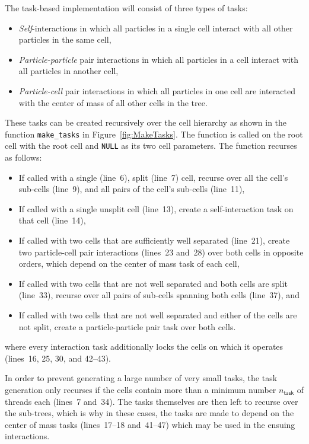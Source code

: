 \documentclass[preprint]{elsarticle}
\newcommand{\fig}[1]
    {Figure~\ref{fig:#1}}
\begin{document}
The task-based implementation will consist of three
types of tasks:
\begin{itemize}
    \item {\em Self}-interactions in which all particles
        in a single cell interact with all other particles in the
        same cell,
    \item {\em Particle-particle} pair interactions in which
        all particles in a cell interact with all
        particles in another cell,
    \item {\em Particle-cell} pair interactions in which
        all particles in one cell are interacted with the
        center of mass of all other cells in the tree.
\end{itemize}

These tasks can be created recursively over the cell hierarchy
as shown in the function {\tt make\_tasks} in \fig{MakeTasks}.
The function is called on the root cell with the root cell
and {\tt NULL} as its two cell parameters.
The function recurses as follows:
\begin{itemize}
    \item If called with a single (line~6), split (line~7) cell,
        recurse over all the cell's sub-cells (line~9), and all
        pairs of the cell's sub-cells (line~11),
    \item If called with a single unsplit cell (line~13),
        create a self-interaction task on that cell (line~14),
    \item If called with two cells that are sufficiently well
        separated (line~21), create two particle-cell pair
        interactions (lines~23 and~28) over both cells in
        opposite orders, which depend on the center of mass
        task of each cell,
    \item If called with two cells that are not well
        separated and both cells are split (line~33),
        recurse over all pairs of sub-cells spanning
        both cells (line~37), and
    \item If called with two cells that are not well separated
        and either of the cells are not split, create
        a particle-particle pair task over both cells.
\end{itemize}
\noindent where every interaction task additionally locks
the cells on which it operates (lines~16, 25, 30, and 42--43).

In order to prevent generating
a large number of very small tasks, the task generation only recurses
if the cells contain more than a minimum number $n_\mathsf{task}$
of threads each (lines~7 and~34).
The tasks themselves are then left to recurse over the sub-trees,
which is why in these cases, the tasks are made to depend on the
center of mass tasks (lines~17--18 and~41--47)
which may be used in the ensuing interactions.
\end{document}
